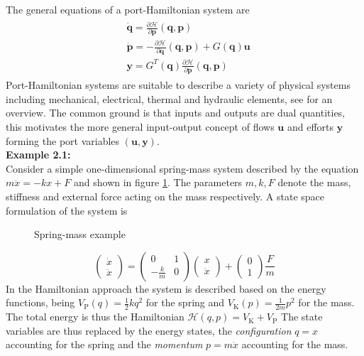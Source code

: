 \documentclass[a4paper,twoside, openright,12pt]{report}
\newcommand{\f}[1]{\boldsymbol{#1}}
\newcommand{\g}[1]{\text{#1}}
\begin{document}
{The general equations of a port-Hamiltonian system are
\begin{eqnarray}
\begin{aligned}
	& \dot{\f{q}} = \frac{\partial \mathcal{H}}{\partial \f{p}}				(\f{q},\f{p})\\
	& \dot{\f{p}} = -\frac{\partial \mathcal{H}}{\partial \f{q}}				(\f{q},\f{p})+G(\f{q})\f{u} \\ 
	&\f{y} = G^T(\f{q})\frac{\partial \mathcal{H}}{\partial 				\f{p}}(\f{q},\f{p})
\end{aligned}	
\end{eqnarray}
Port-Hamiltonian systems are suitable to describe a variety of physical systems including mechanical, electrical, thermal and hydraulic elements, see \cite{duindam2009geoplexbook} for an overview. The common ground is that inputs and outputs are dual quantities, this motivates the more general input-output concept of flows $\f{u}$ and efforts $\f{y}$ forming the port variables $(\f{u},\f{y})$.\\
\textbf{Example 2.1:}\\
Consider a simple one-dimensional spring-mass system described by the equation $ m\ddot{x} = -kx +F $ and shown in figure \ref{FIG:springmass}. The parameters $ m,k,F $ denote the mass, stiffness and external force acting on the mass respectively. A state space formulation of the system is
\begin{figure}[b!]
	\centering
	\small
	\def\svgwidth{0.5\columnwidth}
	
	\caption[Spring-mass example]{Spring-mass example}
	\label{FIG:springmass}
\end{figure}
\begin{equation}
	\begin{pmatrix}\dot{x} \\ \ddot{x}\end{pmatrix} =
	\begin{pmatrix}0 & 1 \\ -\frac{k}{m} & 0\end{pmatrix}
	\begin{pmatrix}x \\ \dot{x}\end{pmatrix} + 
	\begin{pmatrix}0 \\ 1\end{pmatrix}\frac{F}{m}
\end{equation}
In the Hamiltonian approach the system is described based on the energy functions, being $ V_\g{P}(q) = \frac{1}{2}kq^2 $ for the spring and $ V_\g{K}(p) = \frac{1}{2m}p^2 $ for the mass. The total energy is thus the Hamiltonian $\mathcal{H}(q,p) = V_\g{K} + V_\g{P}$ The state variables are thus replaced by the energy states, the \emph{configuration} $q=x$ accounting for the spring and the \emph{momentum} $p=m\dot{x}$ accounting for the mass.  
}
\end{document}
